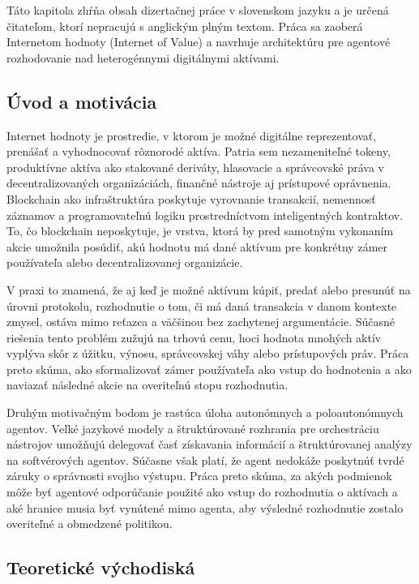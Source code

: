 
Táto kapitola zhŕňa obsah dizertačnej práce v slovenskom jazyku a je určená čitateľom, ktorí nepracujú s anglickým plným textom. Práca sa zaoberá Internetom hodnoty (Internet of Value) a navrhuje architektúru pre agentové rozhodovanie nad heterogénnymi digitálnymi aktívami.

\subsection{Úvod a motivácia}

Internet hodnoty je prostredie, v ktorom je možné digitálne reprezentovať, prenášať a vyhodnocovať rôznorodé aktíva. Patria sem nezameniteľné tokeny, produktívne aktíva ako stakované deriváty, hlasovacie a správcovské práva v decentralizovaných organizáciách, finančné nástroje aj prístupové oprávnenia. Blockchain ako infraštruktúra poskytuje vyrovnanie transakcií, nemennosť záznamov a programovateľnú logiku prostredníctvom inteligentných kontraktov. To, čo blockchain neposkytuje, je vrstva, ktorá by pred samotným vykonaním akcie umožnila posúdiť, akú hodnotu má dané aktívum pre konkrétny zámer používateľa alebo decentralizovanej organizácie.

V praxi to znamená, že aj keď je možné aktívum kúpiť, predať alebo presunúť na úrovni protokolu, rozhodnutie o tom, či má daná transakcia v danom kontexte zmysel, ostáva mimo reťazca a väčšinou bez zachytenej argumentácie. Súčasné riešenia tento problém zužujú na trhovú cenu, hoci hodnota mnohých aktív vyplýva skôr z úžitku, výnosu, správcovskej váhy alebo prístupových práv. Práca preto skúma, ako sformalizovať zámer používateľa ako vstup do hodnotenia a ako naviazať následné akcie na overiteľnú stopu rozhodnutia.

Druhým motivačným bodom je rastúca úloha autonómnych a poloautonómnych agentov. Veľké jazykové modely a štruktúrované rozhrania pre orchestráciu nástrojov umožňujú delegovať časť získavania informácií a štruktúrovanej analýzy na softvérových agentov. Súčasne však platí, že agent nedokáže poskytnúť tvrdé záruky o správnosti svojho výstupu. Práca preto skúma, za akých podmienok môže byť agentové odporúčanie použité ako vstup do rozhodnutia o aktívach a aké hranice musia byť vynútené mimo agenta, aby výsledné rozhodnutie zostalo overiteľné a obmedzené politikou.

\subsection{Teoretické východiská}

